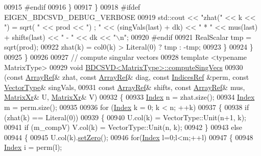 \begin{DoxyCode}
00915 \textcolor{preprocessor}{#endif}
00916         \}
00917       \}
00918 \textcolor{preprocessor}{#ifdef EIGEN\_BDCSVD\_DEBUG\_VERBOSE}
00919       std::cout << \textcolor{stringliteral}{"zhat("} << k << \textcolor{stringliteral}{") =  sqrt( "} << prod << \textcolor{stringliteral}{")  ;  "} << (singVals(last) + dk) << \textcolor{stringliteral}{" * "} << 
      mus(last) + shifts(last) << \textcolor{stringliteral}{" - "} << dk << \textcolor{stringliteral}{"\(\backslash\)n"};
00920 \textcolor{preprocessor}{#endif}
00921       RealScalar tmp = sqrt(prod);
00922       zhat(k) = col0(k) > Literal(0) ? tmp : -tmp;
00923     \}
00924   \}
00925 \}
00926 
00927 \textcolor{comment}{// compute singular vectors}
00928 \textcolor{keyword}{template} <\textcolor{keyword}{typename} MatrixType>
00929 \textcolor{keywordtype}{void} \hyperlink{group___s_v_d___module_class_eigen_1_1_b_d_c_s_v_d}{BDCSVD<MatrixType>::computeSingVecs}
00930    (\textcolor{keyword}{const} \hyperlink{group___core___module_class_eigen_1_1_ref}{ArrayRef}& zhat, \textcolor{keyword}{const} \hyperlink{group___core___module_class_eigen_1_1_ref}{ArrayRef}& diag, \textcolor{keyword}{const} \hyperlink{group___core___module_class_eigen_1_1_ref}{IndicesRef} &perm, \textcolor{keyword}{const} 
      \hyperlink{group___core___module}{VectorType}& singVals,
00931     \textcolor{keyword}{const} \hyperlink{group___core___module_class_eigen_1_1_ref}{ArrayRef}& shifts, \textcolor{keyword}{const} \hyperlink{group___core___module_class_eigen_1_1_ref}{ArrayRef}& mus, \hyperlink{group___core___module}{MatrixXr}& U, 
      \hyperlink{group___core___module}{MatrixXr}& V)
00932 \{
00933   \hyperlink{namespace_eigen_a62e77e0933482dafde8fe197d9a2cfde}{Index} n = zhat.size();
00934   \hyperlink{namespace_eigen_a62e77e0933482dafde8fe197d9a2cfde}{Index} m = perm.size();
00935   
00936   \textcolor{keywordflow}{for} (\hyperlink{namespace_eigen_a62e77e0933482dafde8fe197d9a2cfde}{Index} k = 0; k < n; ++k)
00937   \{
00938     \textcolor{keywordflow}{if} (zhat(k) == Literal(0))
00939     \{
00940       U.col(k) = VectorType::Unit(n+1, k);
00941       \textcolor{keywordflow}{if} (m\_compV) V.col(k) = VectorType::Unit(n, k);
00942     \}
00943     \textcolor{keywordflow}{else}
00944     \{
00945       U.col(k).\hyperlink{class_eigen_1_1_plain_object_base_ac21ad5f989f320e46958b75ac8d9a1da}{setZero}();
00946       \textcolor{keywordflow}{for}(\hyperlink{namespace_eigen_a62e77e0933482dafde8fe197d9a2cfde}{Index} l=0;l<m;++l)
00947       \{
00948         \hyperlink{namespace_eigen_a62e77e0933482dafde8fe197d9a2cfde}{Index} i = perm(l);

\end{DoxyCode}
